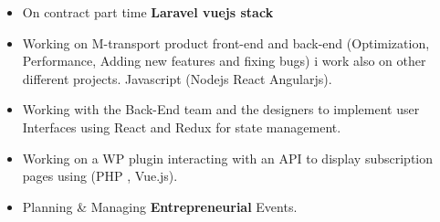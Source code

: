 \documentclass[10pt,a4paper,ragged2e]{altacv}
\begin{document}





\begin{fullwidth}


\begin{itemize}
\item On contract part time \textbf {Laravel vuejs stack}
\end{itemize}

\divider

\begin{itemize}
\item Working on M-transport product front-end and back-end (Optimization, Performance, Adding new features and fixing bugs) i work also on other different projects.
Javascript (Nodejs React Angularjs).
\end{itemize}

\divider

\begin{itemize}
\item Working with the Back-End team and the designers to implement user Interfaces using React and Redux for state management.
\end{itemize}

\divider

\begin{itemize}
\item Working on a WP plugin interacting with an API to display 
subscription pages using (PHP , Vue.js).

\end{itemize}

\divider

\begin{itemize}
\item Planning \& Managing \textbf{Entrepreneurial} Events.


\end{itemize}
\end{fullwidth}
\end{document}
